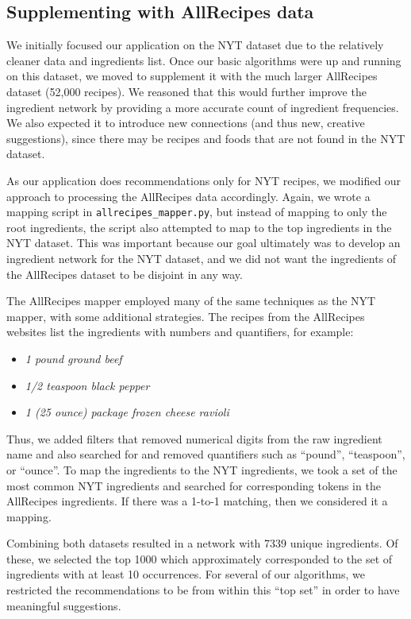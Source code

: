 \documentclass{acm_proc_article-sp}
\begin{document}
\subsection{Supplementing with AllRecipes data}
We initially focused our application on the NYT dataset due to the relatively cleaner data and ingredients list. Once our basic algorithms were up and running on this dataset, we moved to supplement it with the much larger AllRecipes dataset (52,000 recipes). We reasoned that this would further improve the ingredient network by providing a more accurate count of ingredient frequencies. We also expected it to introduce new connections (and thus new, creative suggestions), since there may be recipes and foods that are not found in the NYT dataset.

As our application does recommendations only for NYT recipes, we modified our approach to processing the AllRecipes data accordingly. Again, we wrote a mapping script in \texttt{allrecipes\_mapper.py}, but instead of mapping to only the root ingredients, the script also attempted to map to the top ingredients in the NYT dataset. This was important because our goal ultimately was to develop an ingredient network for the NYT dataset, and we did not want the ingredients of the AllRecipes dataset to be disjoint in any way. 

The AllRecipes mapper employed many of the same techniques as the NYT mapper, with some additional strategies. The recipes from the AllRecipes websites list the ingredients with numbers and quantifiers, for example:
\begin{itemize}
       \item {\em 1 pound ground beef}
       \item {\em 1/2 teaspoon black pepper}
       \item {\em 1 (25 ounce) package frozen cheese ravioli}
\end{itemize}
Thus, we added filters that removed numerical digits from the raw ingredient name and also searched for and removed quantifiers such as ``pound'', ``teaspoon'', or ``ounce''. To map the ingredients to the NYT ingredients, we took a set of the most common NYT ingredients and searched for corresponding tokens in the AllRecipes ingredients. If there was a 1-to-1 matching, then we considered it a mapping.

Combining both datasets resulted in a network with 7339 unique ingredients. Of these, we selected the top 1000 which approximately corresponded to the set of ingredients with at least 10 occurrences. For several of our algorithms, we restricted the recommendations to be from within this ``top set'' in order to have meaningful suggestions.
\end{document}
